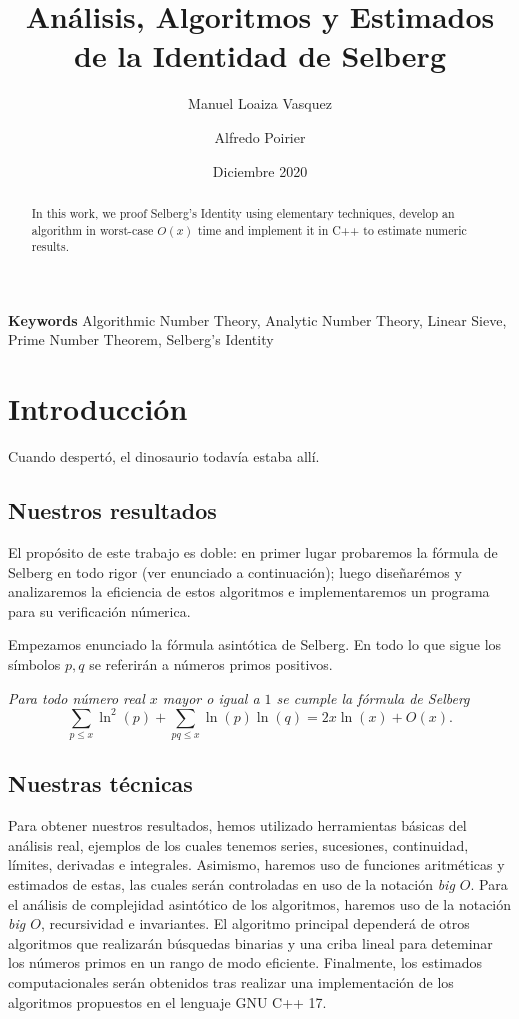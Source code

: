 \documentclass[10pt]{article}
\title{An\'alisis, Algoritmos y Estimados de la Identidad de Selberg}
\author[1]{Manuel Loaiza Vasquez}
\author[2]{Alfredo Poirier}
\affil[1, 2]{Departamento de Matem\'aticas,  
Pontificia Universidad Cat\'olica del Per\'u, Lima, Per\'u}
\date{Diciembre 2020}
\providecommand{\keywords}[1]
{
  \bigskip
  \textbf{Keywords} #1
}
\theoremstyle{definition}
\theoremstyle{remark}
\begin{document}
\maketitle

\begin{abstract}

In this work, we proof Selberg's Identity using elementary techniques,
develop an algorithm in worst-case $O(x)$ time and
implement it in C++ to estimate numeric results.
\end{abstract}
\keywords{Algorithmic Number Theory, Analytic Number Theory, Linear Sieve, Prime Number Theorem, Selberg's Identity}

\section{Introducci\'on}
Cuando despert\'o, el dinosaurio todav\'ia estaba all\'i.
 
\subsection{Nuestros resultados}
El prop\'osito de este trabajo es doble: 
en primer lugar probaremos la f\'ormula de Selberg en todo rigor (ver enunciado a continuaci\'on); 
luego diseñar\'emos y analizaremos la eficiencia de estos algoritmos e
implementaremos un programa para su verificaci\'on n\'umerica.
\bigskip

Empezamos enunciado la f\'ormula asint\'otica de Selberg. 
En todo lo que sigue los s\'imbolos $p,q$ se referir\'an a n\'umeros primos positivos.
\bigskip

{\it Para todo n\'umero real $x$ mayor o igual a $1$ se cumple la f\'ormula de Selberg}
\[
\sum_{p \leq x} \ln^2(p) + \sum_{pq \leq x} \ln(p) \ln(q) = 2x\ln(x) + O(x).
\]

\subsection{Nuestras t\'ecnicas}
Para obtener nuestros resultados, hemos utilizado herramientas b\'asicas del
an\'alisis real, ejemplos de los cuales tenemos series, sucesiones, continuidad,
l\'imites, derivadas e integrales. 
Asimismo, haremos uso de funciones aritm\'eticas
y estimados de estas, las cuales ser\'an controladas en uso de la notaci\'on {\it big $O$}.
Para el an\'alisis de complejidad asint\'otico de los algoritmos,
haremos uso de la notaci\'on {\it big $O$}, recursividad e invariantes.
El algoritmo principal depender\'a de otros algoritmos que realizar\'an
b\'usquedas binarias y una criba lineal para deteminar los n\'umeros primos en un rango de modo eficiente.
Finalmente, los estimados computacionales ser\'an obtenidos tras realizar una
implementaci\'on de los algoritmos propuestos en el lenguaje GNU C++ 17.
\end{document}
